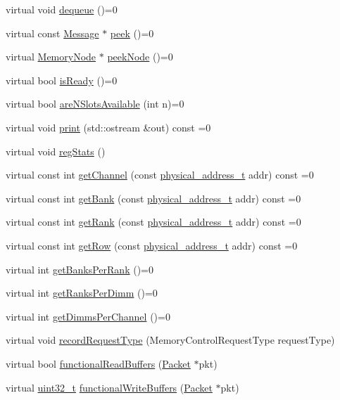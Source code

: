 \begin{DoxyCompactItemize}
virtual void \hyperlink{classMemoryControl_abc9fc85f4dd561e833bf6b34a78ebcb8}{dequeue} ()=0
\item 
virtual const \hyperlink{classMessage}{Message} $\ast$ \hyperlink{classMemoryControl_a822b263266795dc49c26e24dc6eb4b54}{peek} ()=0
\item 
virtual \hyperlink{classMemoryNode}{MemoryNode} $\ast$ \hyperlink{classMemoryControl_a1daeb227a1c754432729a75c7997d275}{peekNode} ()=0
\item 
virtual bool \hyperlink{classMemoryControl_a90b7287ef3808f6b4b355495d24a9b38}{isReady} ()=0
\item 
virtual bool \hyperlink{classMemoryControl_ad5bc408383076d5b274d5c3be9b42c89}{areNSlotsAvailable} (int n)=0
\item 
virtual void \hyperlink{classMemoryControl_a3ea5f7af5db62cc24f4e40df9ea5c971}{print} (std::ostream \&out) const =0
\item 
virtual void \hyperlink{classMemoryControl_ac1739a9be0fbd5d96cf441cd3b2c1c78}{regStats} ()
\item 
virtual const int \hyperlink{classMemoryControl_a439a91ae6f587e18a500ba947d0728d5}{getChannel} (const \hyperlink{TypeDefines_8hh_a7901e1a365850c5ff38ec6e12b6b9ffc}{physical\_\-address\_\-t} addr) const =0
\item 
virtual const int \hyperlink{classMemoryControl_a7a4691e15d68d8bf9df636adff2c964f}{getBank} (const \hyperlink{TypeDefines_8hh_a7901e1a365850c5ff38ec6e12b6b9ffc}{physical\_\-address\_\-t} addr) const =0
\item 
virtual const int \hyperlink{classMemoryControl_a22565804f54291d8c37b7456c157f814}{getRank} (const \hyperlink{TypeDefines_8hh_a7901e1a365850c5ff38ec6e12b6b9ffc}{physical\_\-address\_\-t} addr) const =0
\item 
virtual const int \hyperlink{classMemoryControl_a86eabafc0d8d68214de261fc7a333a04}{getRow} (const \hyperlink{TypeDefines_8hh_a7901e1a365850c5ff38ec6e12b6b9ffc}{physical\_\-address\_\-t} addr) const =0
\item 
virtual int \hyperlink{classMemoryControl_a931e1da3d57d22fd7f4ba3583697c336}{getBanksPerRank} ()=0
\item 
virtual int \hyperlink{classMemoryControl_a8fc5f029d5373799975a32fcd559400c}{getRanksPerDimm} ()=0
\item 
virtual int \hyperlink{classMemoryControl_a6f39efbb6d1f061b2f6467ac33f6ce34}{getDimmsPerChannel} ()=0
\item 
virtual void \hyperlink{classMemoryControl_a8dec08568d22323e381f2e55d4ced403}{recordRequestType} (MemoryControlRequestType requestType)
\item 
virtual bool \hyperlink{classMemoryControl_ad587c16967cd8dc8b1dcb52a1ce0002b}{functionalReadBuffers} (\hyperlink{classPacket}{Packet} $\ast$pkt)
\item 
virtual \hyperlink{Type_8hh_a435d1572bf3f880d55459d9805097f62}{uint32\_\-t} \hyperlink{classMemoryControl_aa1cf5fd9152389ffd0e21700945a149d}{functionalWriteBuffers} (\hyperlink{classPacket}{Packet} $\ast$pkt)
\end{DoxyCompactItemize}
